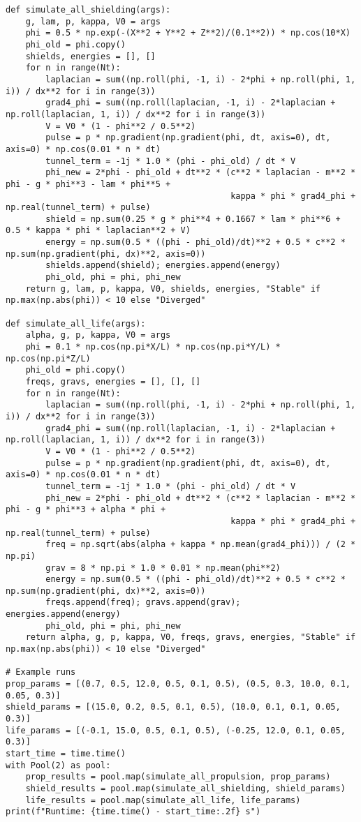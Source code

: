 \documentclass[11pt]{article}
\begin{document}
\begin{lstlisting}
def simulate_all_shielding(args):
    g, lam, p, kappa, V0 = args
    phi = 0.5 * np.exp(-(X**2 + Y**2 + Z**2)/(0.1**2)) * np.cos(10*X)
    phi_old = phi.copy()
    shields, energies = [], []
    for n in range(Nt):
        laplacian = sum((np.roll(phi, -1, i) - 2*phi + np.roll(phi, 1, i)) / dx**2 for i in range(3))
        grad4_phi = sum((np.roll(laplacian, -1, i) - 2*laplacian + np.roll(laplacian, 1, i)) / dx**2 for i in range(3))
        V = V0 * (1 - phi**2 / 0.5**2)
        pulse = p * np.gradient(np.gradient(phi, dt, axis=0), dt, axis=0) * np.cos(0.01 * n * dt)
        tunnel_term = -1j * 1.0 * (phi - phi_old) / dt * V
        phi_new = 2*phi - phi_old + dt**2 * (c**2 * laplacian - m**2 * phi - g * phi**3 - lam * phi**5 + 
                                             kappa * phi * grad4_phi + np.real(tunnel_term) + pulse)
        shield = np.sum(0.25 * g * phi**4 + 0.1667 * lam * phi**6 + 0.5 * kappa * phi * laplacian**2 + V)
        energy = np.sum(0.5 * ((phi - phi_old)/dt)**2 + 0.5 * c**2 * np.sum(np.gradient(phi, dx)**2, axis=0))
        shields.append(shield); energies.append(energy)
        phi_old, phi = phi, phi_new
    return g, lam, p, kappa, V0, shields, energies, "Stable" if np.max(np.abs(phi)) < 10 else "Diverged"

def simulate_all_life(args):
    alpha, g, p, kappa, V0 = args
    phi = 0.1 * np.cos(np.pi*X/L) * np.cos(np.pi*Y/L) * np.cos(np.pi*Z/L)
    phi_old = phi.copy()
    freqs, gravs, energies = [], [], []
    for n in range(Nt):
        laplacian = sum((np.roll(phi, -1, i) - 2*phi + np.roll(phi, 1, i)) / dx**2 for i in range(3))
        grad4_phi = sum((np.roll(laplacian, -1, i) - 2*laplacian + np.roll(laplacian, 1, i)) / dx**2 for i in range(3))
        V = V0 * (1 - phi**2 / 0.5**2)
        pulse = p * np.gradient(np.gradient(phi, dt, axis=0), dt, axis=0) * np.cos(0.01 * n * dt)
        tunnel_term = -1j * 1.0 * (phi - phi_old) / dt * V
        phi_new = 2*phi - phi_old + dt**2 * (c**2 * laplacian - m**2 * phi - g * phi**3 + alpha * phi + 
                                             kappa * phi * grad4_phi + np.real(tunnel_term) + pulse)
        freq = np.sqrt(abs(alpha + kappa * np.mean(grad4_phi))) / (2 * np.pi)
        grav = 8 * np.pi * 1.0 * 0.01 * np.mean(phi**2)
        energy = np.sum(0.5 * ((phi - phi_old)/dt)**2 + 0.5 * c**2 * np.sum(np.gradient(phi, dx)**2, axis=0))
        freqs.append(freq); gravs.append(grav); energies.append(energy)
        phi_old, phi = phi, phi_new
    return alpha, g, p, kappa, V0, freqs, gravs, energies, "Stable" if np.max(np.abs(phi)) < 10 else "Diverged"

# Example runs
prop_params = [(0.7, 0.5, 12.0, 0.5, 0.1, 0.5), (0.5, 0.3, 10.0, 0.1, 0.05, 0.3)]
shield_params = [(15.0, 0.2, 0.5, 0.1, 0.5), (10.0, 0.1, 0.1, 0.05, 0.3)]
life_params = [(-0.1, 15.0, 0.5, 0.1, 0.5), (-0.25, 12.0, 0.1, 0.05, 0.3)]
start_time = time.time()
with Pool(2) as pool:
    prop_results = pool.map(simulate_all_propulsion, prop_params)
    shield_results = pool.map(simulate_all_shielding, shield_params)
    life_results = pool.map(simulate_all_life, life_params)
print(f"Runtime: {time.time() - start_time:.2f} s")
\end{lstlisting}
\end{document}

